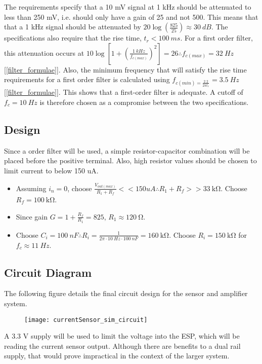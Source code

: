 The requirements specify that a 10 mV signal at 1 kHz should be attenuated to less than 250 mV, i.e. should only have a gain of 25 and not 500. This means that
that a 1 kHz signal should be attenuated by $20 \log (\frac{825}{25}) \approx \SI{30}{dB}$. The specifications also require that the rise time, $t_r < \SI{100}{ms}$.
For a first order filter, this attenuation occurs at $10 \log \left[1 + \left(\frac{\SI{1}{kHz}}{f_{c(max)}}\right)^2\right] = 26 \therefore f_{c(max)} = \SI{32}{Hz}$ [\ref{filter_formulae}].
Also, the minimum frequency that will satisfy the rise time requirements for a first order filter is calculated using $f_{c(min) = \frac{2.2}{2 \pi t_r}} = \SI{3.5}{Hz}$ [\ref{filter_formulae}].
This shows that a first-order filter is adequate. A cutoff of $f_c = \SI{10}{Hz}$ is therefore chosen as a compromise between the two specifications.

\pagebreak

\subsection{Design}
Since a  order filter will be used, a simple resistor-capacitor combination will be placed before the positive terminal.
Also, high resistor values should be chosen to limit current to below 150 uA.
\begin{itemize}
  \item Assuming $i_n = 0$, choose $\frac{V_{out(max)}}{R_1 + R_f} << 150 uA \therefore R_1 + R_f >> \SI{33}{\kilo\ohm}$. Choose $R_f = \SI{100}{\kilo\ohm}$.
  \item Since gain $G = 1 + \frac{R_f}{R_1} = 825$, $R_1 \approx \SI{120}{\ohm}$.
  \item Choose $C_i = \SI{100}{nF} \therefore R_i = \frac{1}{2 \pi \cdot \SI{10}{Hz} \cdot \SI{100}{nF}} = \SI{160}{\kilo\ohm}$. Choose $R_i = \SI{150}{\kilo\ohm}$ for $f_c \approx \SI{11}{Hz}$.
\end{itemize}

\subsection{Circuit Diagram}
The following figure details the final circuit design for the sensor and amplifier system.

\begin{figure}[h!]
  \centering
  \texttt{[image: currentSensor\_sim\_circuit]}
  \label{fig:circuit-diagram}
\end{figure}

A 3.3 V supply will be used to limit the voltage into the ESP, which will be reading the current sensor output.
Although there are benefits to a dual rail supply, that would prove impractical in the context of the larger system.

\pagebreak
